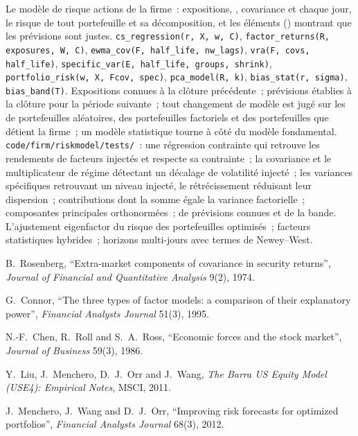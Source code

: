 \begin{build}
 Le modèle de risque actions de la firme~: expositions, , covariance et  chaque jour, le risque de tout portefeuille et sa décomposition,
et les éléments () montrant que les prévisions sont justes.
 \texttt{cs\_regression(r, X, w, C)}, \texttt{factor\_returns(R, exposures, W, C)}, \texttt{ewma\_cov(F, half\_life, nw\_lags)},
\texttt{vra(F, covs, half\_life)}, \texttt{specific\_var(E, half\_life, groups, shrink)}, \texttt{portfolio\_risk(w, X, Fcov, spec)}, \texttt{pca\_model(R, k)},
\texttt{bias\_stat(r, sigma)}, \texttt{bias\_band(T)}.
 Expositions connues à la clôture précédente~; prévisions établies à la clôture pour la période suivante~; tout changement de modèle est jugé sur les  de
portefeuilles aléatoires, des portefeuilles factoriels et des portefeuilles que détient la firme~; un modèle statistique tourne à côté du modèle fondamental.
 \texttt{code/firm/riskmodel/tests/}~: une régression contrainte qui retrouve les rendements de facteurs injectés et respecte sa contrainte~; la
covariance et le multiplicateur de régime détectant un décalage de volatilité injecté~; les variances spécifiques retrouvant un niveau injecté, le rétrécissement réduisant leur dispersion~;
contributions dont la somme égale la variance factorielle~; composantes principales orthonormées~;  de prévisions connues et de la bande.
 L'ajustement eigenfactor du risque des portefeuilles optimisés~; facteurs statistiques hybrides~; horizons multi-jours avec termes de Newey--West.
\end{build}

\begin{omsources}
\item B.~Rosenberg, ``Extra-market components of covariance in security returns'', \emph{Journal of Financial and Quantitative Analysis} 9(2), 1974.
\item G.~Connor, ``The three types of factor models: a comparison of their explanatory power'', \emph{Financial Analysts Journal} 51(3), 1995.
\item N.-F.~Chen, R.~Roll and S.~A.~Ross, ``Economic forces and the stock market'', \emph{Journal of Business} 59(3), 1986.
\item Y.~Liu, J.~Menchero, D.~J.~Orr and J.~Wang, \emph{The Barra US Equity Model (USE4): Empirical Notes}, MSCI, 2011.
\item J.~Menchero, J.~Wang and D.~J.~Orr, ``Improving risk forecasts for optimized portfolios'', \emph{Financial Analysts Journal} 68(3), 2012.
\end{omsources}

